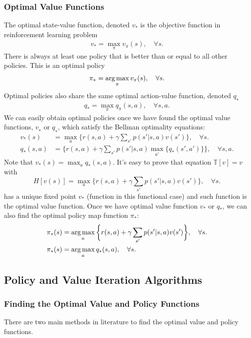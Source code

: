 \documentclass[letterpaper,titlepage]{article}
\begin{document}
\subsubsection*{Optimal Value Functions}
The optimal state-value function, denoted $v_*$ is the objective function in reinforcement learning problem
\begin{align}
v_* = \max_{\pi} v_{\pi} (s), \quad \forall s.
\end{align}
There is always at least one policy that is better than or equal to all other policies. This is an optimal policy
\begin{align}
\pi_* = \operatorname*{arg\,max}_{\pi} v_{\pi} (s), \quad \forall s.
\end{align}
Optimal policies also share the same optimal action-value function, denoted $q_∗$
\begin{align}
q_* = \max_{\pi} q_{\pi} (s,a), \quad \forall s,a.
\end{align}
We can easily obtain optimal policies once we have found the optimal value functions, $v_∗$ or $q_∗$, which satisfy the Bellman optimality equations:
\begin{align}
v_{*}(s) &= \max_a \bigg\{ r(s,a) + \gamma \sum_{s'} p(s' | s, a) v (s') \bigg\}, \quad \forall s. \\
q_{*}(s,a)  &=  \bigg\{ r(s,a) + \gamma \sum_{s'} p(s'| s, a)  \max_{a'} \{ q_* (s',a') \} \bigg\}, \quad \forall s,a.
\end{align}
Note that $v_{*}(s) = \max_{a} q_{*}(s,a)$. It's easy to prove that equation $\mathbb{T}[v] = v$ with
\[
H[v(s)] = \max_a \bigg\{ r(s,a) +  \gamma \sum_{s'} p(s'| s, a)  v (s') \bigg\}, \quad \forall s.
\]
has a unique fixed point $v_*$ (function in this functional case) and such function is the optimal value function. Once we have optimal value function $v_*$ or $q_*$, we can also find the optimal policy map function $\pi_*$:
\begin{align}
\pi_* (s) &= \operatorname*{arg\,max}_{a} \bigg\{ r(s,a) +  \gamma \sum_{s'} p(s'| s, a)  v (s') \bigg\}, \quad \forall s. \\
\pi_* (s) &= \operatorname*{arg\,max}_{a} q_*(s,a), \quad \forall s.
\end{align} 

\subsection{Policy and Value Iteration Algorithms}
\subsubsection*{Finding the Optimal Value and Policy Functions}
There are two main methods in literature to find the optimal value and policy functions.  
\end{document}
